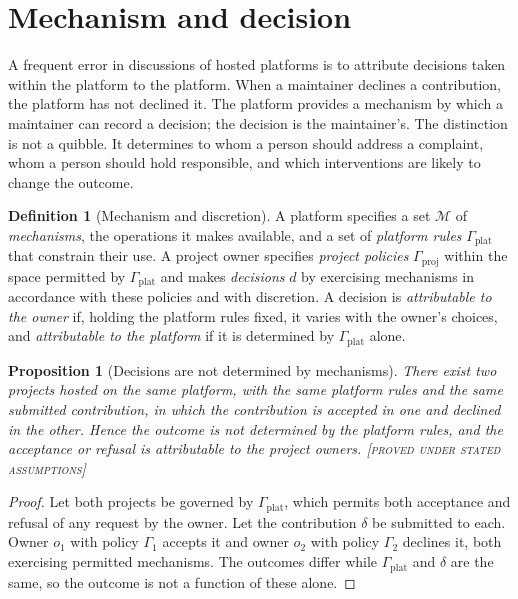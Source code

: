 \documentclass[11pt,twoside,openright]{book}
\theoremstyle{plain}
\newtheorem{proposition}[theorem]{Proposition}
\theoremstyle{definition}
\newtheorem{definition}[theorem]{Definition}
\theoremstyle{remark}
\newcommand{\Proved}{\textup{\textsc{[proved under stated assumptions]}}}
\begin{document}
\section{Mechanism and decision}

A frequent error in discussions of hosted platforms is to attribute decisions taken within the platform to the platform. When a maintainer declines a contribution, the platform has not declined it. The platform provides a mechanism by which a maintainer can record a decision; the decision is the maintainer's. The distinction is not a quibble. It determines to whom a person should address a complaint, whom a person should hold responsible, and which interventions are likely to change the outcome.

\begin{definition}[Mechanism and discretion]\label{def:mechdisc}
A platform specifies a set $\mathcal{M}$ of \emph{mechanisms}, the operations it makes available, and a set of \emph{platform rules} $\Gamma_{\mathrm{plat}}$ that constrain their use. A project owner specifies \emph{project policies} $\Gamma_{\mathrm{proj}}$ within the space permitted by $\Gamma_{\mathrm{plat}}$ and makes \emph{decisions} $d$ by exercising mechanisms in accordance with these policies and with discretion. A decision is \emph{attributable to the owner} if, holding the platform rules fixed, it varies with the owner's choices, and \emph{attributable to the platform} if it is determined by $\Gamma_{\mathrm{plat}}$ alone.
\end{definition}

\begin{proposition}[Decisions are not determined by mechanisms]\label{prop:attribution}
There exist two projects hosted on the same platform, with the same platform rules and the same submitted contribution, in which the contribution is accepted in one and declined in the other. Hence the outcome is not determined by the platform rules, and the acceptance or refusal is attributable to the project owners.
\Proved{}
\end{proposition}

\begin{proof}
Let both projects be governed by $\Gamma_{\mathrm{plat}}$, which permits both acceptance and refusal of any request by the owner. Let the contribution $\delta$ be submitted to each. Owner $o_1$ with policy $\Gamma_1$ accepts it and owner $o_2$ with policy $\Gamma_2$ declines it, both exercising permitted mechanisms. The outcomes differ while $\Gamma_{\mathrm{plat}}$ and $\delta$ are the same, so the outcome is not a function of these alone.
\end{proof}
\end{document}
